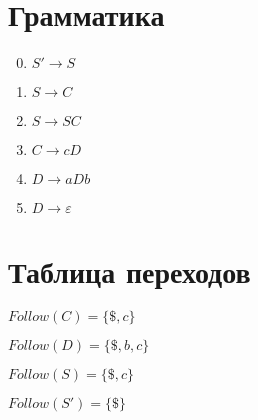 \documentclass[12pt]{article}
\begin{document}
\section*{Грамматика}

\begin{enumerate}
\setcounter{enumi}{-1}
\item $S' \rightarrow S$
\item $S \rightarrow C$
\item $S \rightarrow SC$
\item $C \rightarrow cD$
\item $D \rightarrow aDb$
\item $D \rightarrow \varepsilon$
\end{enumerate}

\section*{Таблица переходов}

$Follow(C) = \{ \$, c \}$

$Follow(D) = \{ \$, b, c \}$

$Follow(S) = \{ \$, c \}$

$Follow(S') = \{ \$ \}$

\bigbreak
\end{document}
